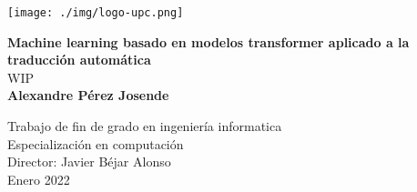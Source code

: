 \begin{titlepage}
\begin{center}

\texttt{[image: ./img/logo-upc.png]}\\[2.0cm]

\vbox{ }

{\LARGE \bfseries  Machine learning basado en modelos transformer aplicado a la traducción automática}\\[1.0cm]
{\Large WIP}\\[3.0cm]

{\large \bfseries Alexandre Pérez Josende}
\vfill

{\normalsize Trabajo de fin de grado en ingeniería informatica}\\
{\normalsize Especialización en computación}\\[0.4cm]

{\normalsize Director: Javier Béjar Alonso}\\

{\normalsize Enero 2022}

\end{center}
\end{titlepage}